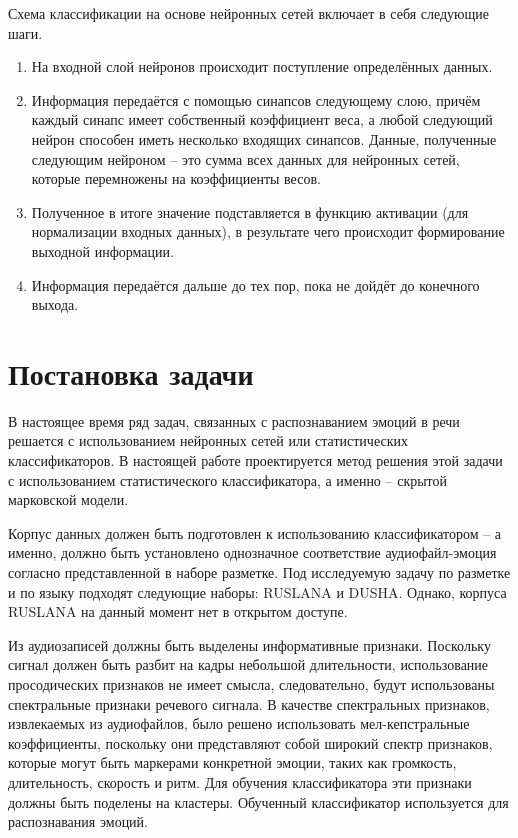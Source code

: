 Схема классификации на основе нейронных сетей включает в себя следующие шаги.
\begin{enumerate}
	\item На входной слой нейронов происходит поступление определённых данных.
	\item Информация передаётся с помощью синапсов следующему слою, причём каждый синапс имеет собственный коэффициент веса, а любой следующий нейрон способен иметь несколько входящих синапсов. Данные, полученные следующим нейроном -- это сумма всех данных для нейронных сетей, которые перемножены на коэффициенты весов.
	\item Полученное в итоге значение подставляется в функцию активации (для нормализации входных данных), в результате чего происходит формирование выходной информации.
	\item Информация передаётся дальше до тех пор, пока не дойдёт до конечного выхода.
\end{enumerate}	

\section{Постановка задачи}
В настоящее время ряд задач, связанных с распознаванием эмоций в речи решается с использованием нейронных сетей или статистических классификаторов. В настоящей работе проектируется метод решения этой задачи с использованием статистического классификатора, а именно -- скрытой марковской модели. 

Корпус данных должен быть подготовлен к использованию классификатором -- а именно, должно быть установлено однозначное соответствие аудиофайл-эмоция согласно представленной в наборе разметке. Под исследуемую задачу по разметке и по языку подходят следующие наборы: RUSLANA и DUSHA. Однако, корпуса RUSLANA на данный момент нет в открытом доступе.

Из аудиозаписей должны быть выделены информативные признаки. Поскольку сигнал должен быть разбит на кадры небольшой длительности, использование просодических признаков не имеет смысла, следовательно, будут использованы спектральные признаки речевого сигнала. В качестве спектральных признаков, извлекаемых из аудиофайлов, было решено использовать мел-кепстральные коэффициенты, поскольку они представляют собой широкий спектр признаков, которые могут быть маркерами конкретной эмоции, таких как громкость, длительность, скорость и ритм. Для обучения классификатора эти признаки должны быть поделены на кластеры. Обученный классификатор используется для распознавания эмоций.

